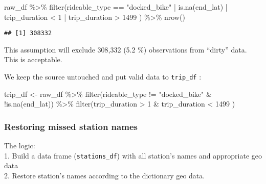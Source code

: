 \documentclass[
]{article}
\newenvironment{Shaded}{\begin{snugshade}}{\end{snugshade}}
\newcommand{\DecValTok}[1]{\textcolor[rgb]{0.00,0.00,0.81}{#1}}
\newcommand{\FunctionTok}[1]{\textcolor[rgb]{0.00,0.00,0.00}{#1}}
\newcommand{\NormalTok}[1]{#1}
\newcommand{\OtherTok}[1]{\textcolor[rgb]{0.56,0.35,0.01}{#1}}
\newcommand{\SpecialCharTok}[1]{\textcolor[rgb]{0.00,0.00,0.00}{#1}}
\newcommand{\StringTok}[1]{\textcolor[rgb]{0.31,0.60,0.02}{#1}}
\begin{document}
\begin{Shaded}
\begin{Highlighting}[]
\NormalTok{raw\_df }\SpecialCharTok{\%\textgreater{}\%} 
  \FunctionTok{filter}\NormalTok{(rideable\_type }\SpecialCharTok{==} \StringTok{"docked\_bike"} \SpecialCharTok{|} \FunctionTok{is.na}\NormalTok{(end\_lat) }\SpecialCharTok{|}
\NormalTok{           trip\_duration }\SpecialCharTok{\textless{}} \DecValTok{1} \SpecialCharTok{|}\NormalTok{ trip\_duration }\SpecialCharTok{\textgreater{}} \DecValTok{1499}\NormalTok{ ) }\SpecialCharTok{\%\textgreater{}\%} 
  \FunctionTok{nrow}\NormalTok{()}
\end{Highlighting}
\end{Shaded}

\begin{verbatim}
## [1] 308332
\end{verbatim}

This assumption will exclude 308,332 (5.2 \%) observations from
``dirty'' data. This is acceptable.

We keep the source untouched and put valid data to \texttt{trip\_df} :

\begin{Shaded}
\begin{Highlighting}[]
\NormalTok{trip\_df }\OtherTok{\textless{}{-}}\NormalTok{ raw\_df }\SpecialCharTok{\%\textgreater{}\%} 
  \FunctionTok{filter}\NormalTok{(rideable\_type }\SpecialCharTok{!=} \StringTok{"docked\_bike"} \SpecialCharTok{\&} \SpecialCharTok{!}\FunctionTok{is.na}\NormalTok{(end\_lat)) }\SpecialCharTok{\%\textgreater{}\%} 
  \FunctionTok{filter}\NormalTok{(trip\_duration }\SpecialCharTok{\textgreater{}} \DecValTok{1} \SpecialCharTok{\&}
\NormalTok{           trip\_duration }\SpecialCharTok{\textless{}} \DecValTok{1499}\NormalTok{ ) }
\end{Highlighting}
\end{Shaded}

\hypertarget{restoring-missed-station-names}{%
\subsubsection{Restoring missed station
names}\label{restoring-missed-station-names}}

The logic:\\
1. Build a data frame (\texttt{stations\_df}) with all station's names
and appropriate geo data\\
2. Restore station's names according to the dictionary geo data.
\end{document}
